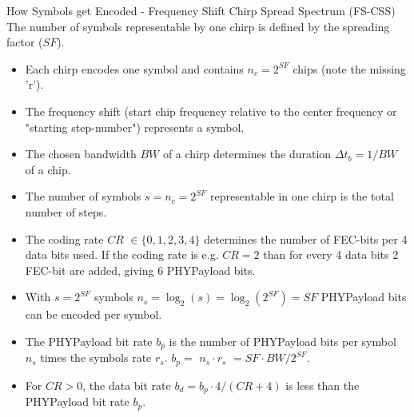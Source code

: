 \begin{frame}{How Symbols get Encoded - \alert{Frequency Shift} Chirp Spread Spectrum (FS-CSS)}
The \alert{number of symbols} representable by one chirp is defined by the \alert{spreading factor} ($SF$).
  \begin{itemize}
    \item \alert{Each chirp} encodes \alert{one symbol} and contains $n_c = 2^{SF}$ \alert{chips} (note the missing 'r').
    \item The \alert{frequency shift} (start chip frequency relative to the center frequency or "{}starting step-number"{}) represents a \alert{symbol}.
    \item The chosen \alert{bandwidth $BW$ of a chirp} determines the \alert{duration} $\Delta t_b = 1 / BW$ of a \alert{chip}.
    \item The \alert{number of symbols} $s = n_c = 2^{SF}$ \alert{representable in one} chirp is the \alert{total number of steps}.
    \item The \alert{coding rate $CR$} $\in \{0, 1, 2, 3, 4\}$ determines the number of \alert{FEC-bits} per \alert{4 data bits} used. If the coding rate is e.g. $CR = 2$ than for every \textcolor{fh-ooe-red}{4} \alert{data bits} \textcolor{fh-ooe-red}{2} \alert{FEC-bit} are added, giving \textcolor{fh-ooe-red}{6} \alert{PHYPayload bits}.
    \item With $s = 2^{SF}$ symbols \alert{$n_s = \log_2(s) = \log_2(2^{SF})= SF$ PHYPayload bits} can be encoded per \alert{symbol}.
    \item The \alert{PHYPayload bit rate} $b_p$ is the number of \alert{PHYPayload bits per symbol $n_s$} times the \alert{symbols rate $r_s$}. \textcolor{fh-ooe-red}{$b_p =$} $ n_s \cdot r_s$ \textcolor{fh-ooe-red}{$= SF \cdot BW / 2^{SF}$}.
    \item For $CR > 0$, the \alert{data bit rate} $b_d  = b_p \cdot 4 / (CR + 4)$ is less than the \alert{PHYPayload bit rate $b_p$}.
  \end{itemize}
\end{frame}
